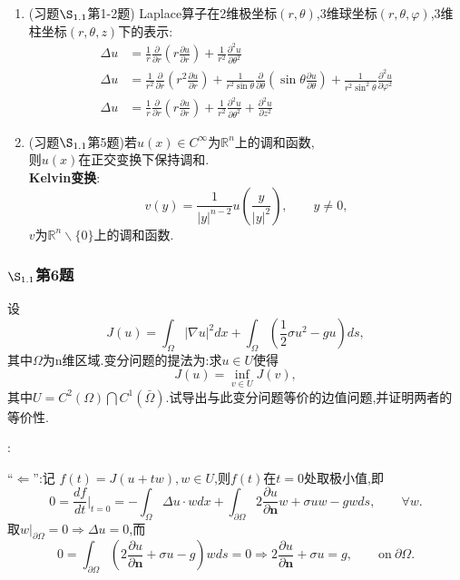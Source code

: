 \documentclass[12pt, a4paper]{article}
\begin{document}
\begin{itemize}
\begin{enumerate}
\begin{enumerate}
            \end{enumerate}
            \item (习题$\S_{1.1}$第1-2题) Laplace算子在2维极坐标$(r, \theta)$,3维球坐标$(r, \theta, \varphi)$,3维柱坐标$(r, \theta, z)$下的表示:
            \begin{align*}
            \Delta u &= \frac1r \frac{\partial}{\partial r}(r\frac{\partial u}{\partial r}) + \frac1{r^2} \frac{\partial^2 u}{\partial \theta^2}\\
            \Delta u &= \frac1{r^2} \frac\partial{\partial r}(r^2\frac{\partial u}{\partial r}) + \frac1{r^2\sin\theta}\frac\partial{\partial \theta}(\sin\theta\frac{\partial u}{\partial\theta}) + \frac1{r^2\sin^2\theta}\frac{\partial^2u}{\partial\varphi^2}\\ 
            \Delta u &= \frac1r \frac\partial{\partial r}(r\frac{\partial u}{\partial r}) + \frac1{r^2}\frac{\partial^2u}{\partial\theta^2} + \frac{\partial^2u}{\partial z^2}
            \end{align*}
            
            \item (习题$\S_{1.1}$第5题)若$u(x)\in C^\infty$为$\mathbb{R}^n$上的调和函数,\\ 则$u(x)$在正交变换下保持调和.\\ {\bf Kelvin变换}:$$v(y) = \frac1{|y|^{n-2}}u(\frac{y}{|y|^2}),\qquad y\neq0,$$ $v$为$\mathbb{R}^n \backslash\{0\}$上的调和函数.
        
        \end{enumerate}
    
    \end{itemize}

    \subsubsection{$\S_{1.1}$第6题}
    \kaishu{}
    设$$J(u) = \int_{\Omega}| \nabla u |^2dx + \int_{\Omega}(\frac12\sigma u^2-gu)ds,$$其中$\Omega$为n维区域.变分问题的提法为:求$u\in U$使得$$J(u) = \mathop{\inf}_{v\in U} J(v),$$其中$U=C^2(\Omega)\bigcap C^1(\bar{\Omega})$.试导出与此变分问题等价的边值问题,并证明两者的等价性.	
    
    \songti{}
    :
    
    ``$\Leftarrow$'':记 $f(t) = J(u+tw), w\in U$,则$f(t)$在$t=0$处取极小值,即$$ 0 = \frac{df}{dt}|_{t=0} = -\int_{\Omega} \Delta u \cdot w dx + \int_{\partial \Omega} 2 \frac{\partial u }{\partial \bm{n}} w + \sigma uw - gw ds, \qquad \forall w.
    $$
    取$w|_{\partial\Omega} = 0 \Rightarrow \Delta u = 0$,而
    $$ 0 = \int_{\partial \Omega}(2 \frac{\partial u }{\partial \bm{n}} + \sigma u - g)w ds = 0 \Rightarrow 2\frac{\partial u }{\partial \bm{n}} + \sigma u = g, \qquad \text{on}\ \partial \Omega.$$
    
\end{document}

